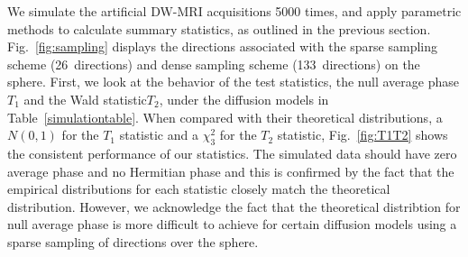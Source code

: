 \documentclass[authoryear,preprint,12pt]{elsarticle}
\begin{document}
We simulate the artificial DW-MRI acquisitions 5000 times, and apply
parametric methods to calculate summary statistics, as outlined in the
previous section.  Fig.~\ref{fig:sampling} displays the directions
associated with the sparse sampling scheme (26~directions) and dense
sampling scheme (133~directions) on the sphere.  First, we look at the
behavior of the test statistics, the null average phase $T_1$ and the
Wald statistic$T_2$, under the diffusion models in
Table~\ref{simulationtable}.
When compared with their theoretical distributions, a $N(0,1)$ for the
$T_1$ statistic and a $\chi^2_3$ for the $T_2$ statistic,
Fig.~\ref{fig:T1T2} shows the consistent performance of our
statistics.  The simulated data should have zero average phase and no
Hermitian phase and this is confirmed by the fact that the empirical
distributions for each statistic closely match the theoretical
distribution.  However, we acknowledge the fact that the theoretical
distribtion for null average phase is more difficult to achieve for
certain diffusion models using a sparse sampling of directions over
the sphere.
\end{document}
